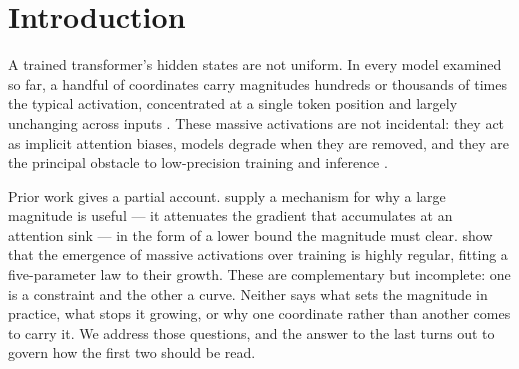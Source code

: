 \documentclass[11pt]{article}
\newcommand{\rms}{\mathrm{rms}}
\begin{document}
\begin{abstract}
further show that the MA's channel \emph{identity} is a stochastic role, not a fixed
dimension---different seeds place the sink on different channels (0/3 top-3 overlap
across seeds), decided by an early competition and locked in by step $\sim$4k; that
whether the MA \emph{stands apart} from a populated tail is a training-maturity
effect (a continuum early, becoming bimodal only late in training), which scopes the
equal-magnitude controls to the continuum regime; and that the late ``death'' of
losing channels is a competitive consolidation in which the sink concentrates onto a
redundant few. Of the mechanisms we test for that competition, three fail on
measurement (rms conservation, attention-sink saturation, and $1/\rms$ gradient
suppression); what survives is that AdamW's second-moment normalization---not raw
gradient magnitude, which is orders below the weight-decay pull---sustains the sink
cohort against decay, while \emph{which} channels win remains set by the early
stochastic lead.
\end{abstract}

\section{Introduction}

A trained transformer's hidden states are not uniform. In every model examined so
far, a handful of coordinates carry magnitudes hundreds or thousands of times the
typical activation, concentrated at a single token position and largely unchanging
across inputs \citep{sun2024massive}. These massive activations are not incidental:
they act as implicit attention biases, models degrade when they are removed, and
they are the principal obstacle to low-precision training and inference
\citep{dettmers2022llmint8,xiao2024streaming}.

Prior work gives a partial account. \citet{chen2026gradient} supply a mechanism for
why a large magnitude is useful --- it attenuates the gradient that accumulates at
an attention sink --- in the form of a lower bound the magnitude must clear.
\citet{gallego2025hidden} show that the emergence of massive activations over
training is highly regular, fitting a five-parameter law to their growth. These are
complementary but incomplete: one is a constraint and the other a curve. Neither
says what sets the magnitude in practice, what stops it growing, or why one
coordinate rather than another comes to carry it. We address those questions, and
the answer to the last turns out to govern how the first two should be read.
\end{document}
